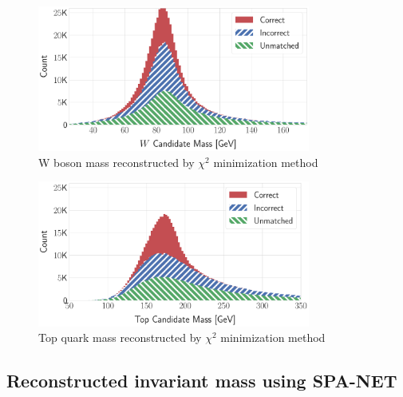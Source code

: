 \begin{figure}[H]
	\centering
	\includegraphics[width=0.8\textwidth]{Figures/network_w_quark_stacked_chi2.pdf}
	\caption{W boson mass reconstructed by $\chi^{2}$ minimization method}
	\label{fig: chi2 reco Wboson}
\end{figure}
\begin{figure}[H]
	\centering
	\includegraphics[width=0.8\textwidth]{Figures/network_t_quark_stacked_chi2.pdf}
	\caption{ Top quark mass reconstructed by $\chi^{2}$ minimization method}
	\label{fig: chi2 reco t quark}
\end{figure}

\subsection{Reconstructed invariant mass using SPA-NET}\label{subsec:reco inv mass spa-net}

